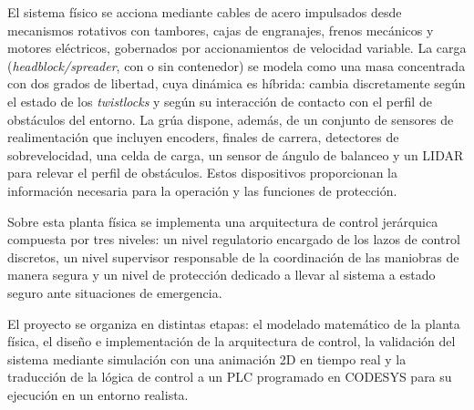 El sistema físico se acciona mediante cables de acero impulsados desde mecanismos rotativos con
tambores, cajas de engranajes, frenos mecánicos y motores eléctricos, gobernados por
accionamientos de velocidad variable. La carga (\textit{headblock/spreader}, con o sin
contenedor) se modela como una masa concentrada con dos grados de libertad, cuya dinámica es
híbrida: cambia discretamente según el estado de los \textit{twistlocks} y según su interacción
de contacto con el perfil de obstáculos del entorno. La grúa dispone, además, de un conjunto de 
sensores de realimentación que incluyen encoders, finales de carrera, detectores de sobrevelocidad, 
una celda de carga, un sensor de ángulo de balanceo y un LIDAR para relevar el perfil de obstáculos. 
Estos dispositivos proporcionan la información necesaria para la operación y las funciones de protección.

Sobre esta planta física se implementa una arquitectura de control jerárquica compuesta por tres niveles: 
un nivel regulatorio encargado de los lazos de control discretos, un nivel supervisor responsable de la 
coordinación de las maniobras de manera segura y un nivel de protección dedicado a llevar al sistema a estado seguro
ante situaciones de emergencia.

El proyecto se organiza en distintas etapas: el modelado matemático de la planta física, el
diseño e implementación de la arquitectura de control, la validación del sistema mediante simulación con una animación 2D en tiempo real
y la traducción de la lógica de control a un PLC programado en CODESYS para su ejecución en un
entorno realista.

